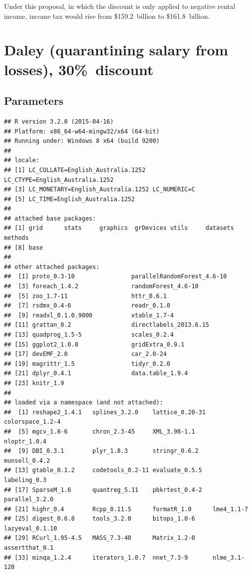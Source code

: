 \documentclass{grattan}\usepackage[]{graphicx}\usepackage[]{color}
\makeatletter
\newenvironment{kframe}{%
 \def\at@end@of@kframe{}%
 \ifinner\ifhmode%
  \def\at@end@of@kframe{\end{minipage}}%
  \begin{minipage}{\columnwidth}%
 \fi\fi%
 \def\FrameCommand##1{\hskip\@totalleftmargin \hskip-\fboxsep
 \colorbox{shadecolor}{##1}\hskip-\fboxsep
     \hskip-\linewidth \hskip-\@totalleftmargin \hskip\columnwidth}%
 \MakeFramed {\advance\hsize-\width
   \@totalleftmargin\z@ \linewidth\hsize
   \@setminipage}}%
 {\par\unskip\endMakeFramed%
 \at@end@of@kframe}
\newenvironment{knitrout}{}{} %
\makeatother
\begin{document}
Under this proposal, in which the discount is only applied to negative rental income, income tax would rise from \$159.2~billion to \$161.8~billion.

\section{Daley (quarantining salary from losses), 30\%\ discount}
\subsection{Parameters}
\nocite{*}

\begin{knitrout}
\color{fgcolor}\begin{kframe}
\begin{verbatim}
## R version 3.2.0 (2015-04-16)
## Platform: x86_64-w64-mingw32/x64 (64-bit)
## Running under: Windows 8 x64 (build 9200)
## 
## locale:
## [1] LC_COLLATE=English_Australia.1252  LC_CTYPE=English_Australia.1252   
## [3] LC_MONETARY=English_Australia.1252 LC_NUMERIC=C                      
## [5] LC_TIME=English_Australia.1252    
## 
## attached base packages:
## [1] grid      stats     graphics  grDevices utils     datasets  methods  
## [8] base     
## 
## other attached packages:
##  [1] proto_0.3-10                parallelRandomForest_4.6-10
##  [3] foreach_1.4.2               randomForest_4.6-10        
##  [5] zoo_1.7-11                  httr_0.6.1                 
##  [7] rsdmx_0.4-6                 readr_0.1.0                
##  [9] readxl_0.1.0.9000           xtable_1.7-4               
## [11] grattan_0.2                 directlabels_2013.6.15     
## [13] quadprog_1.5-5              scales_0.2.4               
## [15] ggplot2_1.0.0               gridExtra_0.9.1            
## [17] devEMF_2.0                  car_2.0-24                 
## [19] magrittr_1.5                tidyr_0.2.0                
## [21] dplyr_0.4.1                 data.table_1.9.4           
## [23] knitr_1.9                  
## 
## loaded via a namespace (and not attached):
##  [1] reshape2_1.4.1   splines_3.2.0    lattice_0.20-31  colorspace_1.2-4
##  [5] mgcv_1.8-6       chron_2.3-45     XML_3.98-1.1     nloptr_1.0.4    
##  [9] DBI_0.3.1        plyr_1.8.3       stringr_0.6.2    munsell_0.4.2   
## [13] gtable_0.1.2     codetools_0.2-11 evaluate_0.5.5   labeling_0.3    
## [17] SparseM_1.6      quantreg_5.11    pbkrtest_0.4-2   parallel_3.2.0  
## [21] highr_0.4        Rcpp_0.11.5      formatR_1.0      lme4_1.1-7      
## [25] digest_0.6.8     tools_3.2.0      bitops_1.0-6     lazyeval_0.1.10 
## [29] RCurl_1.95-4.5   MASS_7.3-40      Matrix_1.2-0     assertthat_0.1  
## [33] minqa_1.2.4      iterators_1.0.7  nnet_7.3-9       nlme_3.1-120
\end{verbatim}
\end{kframe}
\end{knitrout}
\twocolumn

\printbibliography
\end{document}
